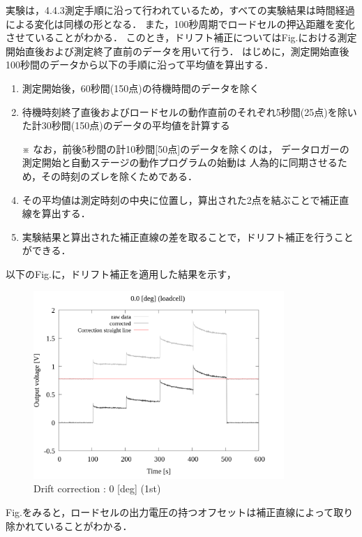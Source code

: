 実験は，4.4.3測定手順に沿って行われているため，すべての実験結果は時間経過による変化は同様の形となる．
また，100秒周期でロードセルの押込距離を変化させていることがわかる．
このとき，ドリフト補正についてはFig.における測定開始直後および測定終了直前のデータを用いて行う．
はじめに，測定開始直後100秒間のデータから以下の手順に沿って平均値を算出する．

\begin{enumerate}[(1)]
    \item 測定開始後，60秒間(150点)の待機時間のデータを除く
    \item 待機時刻終了直後およびロードセルの動作直前のそれぞれ5秒間(25点)を除いた計30秒間(150点)のデータの平均値を計算する
    \item [※] なお，前後5秒間の計10秒間[50点]のデータを除くのは，
          データロガーの測定開始と自動ステージの動作プログラムの始動は
          人為的に同期させるため，その時刻のズレを除くためである．
    \item その平均値は測定時刻の中央に位置し，算出された2点を結ぶことで補正直線を算出する．
    \item 実験結果と算出された補正直線の差を取ることで，ドリフト補正を行うことができる．
\end{enumerate}

以下のFig.に，ドリフト補正を適用した結果を示す，

\begin{figure}[htbp]
    \footnotesize
    \begin{center}
        \includegraphics[width=95mm]{../../02_workspace/result/2-1/plot/02-1_loadcell/02_loadcell-drift_0.png}
        \caption{Drift correction : 0 [deg] (1st)}
    \end{center}
\end{figure}

Fig.をみると，ロードセルの出力電圧の持つオフセットは補正直線によって取り除かれていることがわかる．

